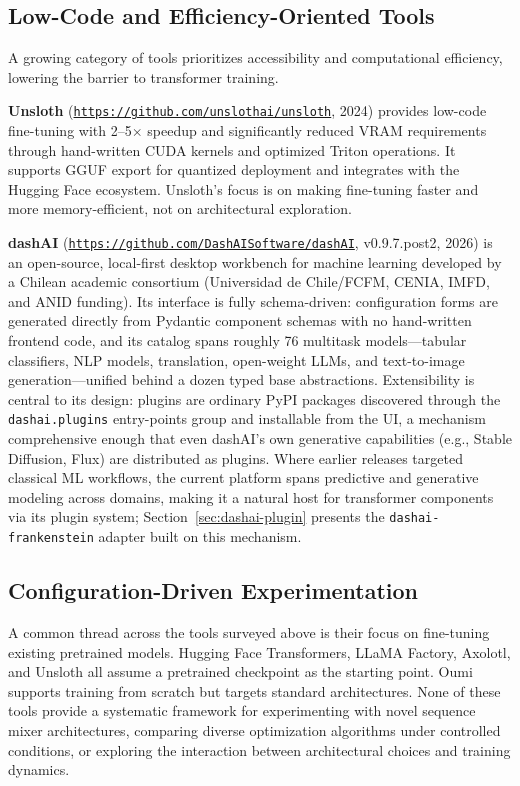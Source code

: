 \subsection{Low-Code and Efficiency-Oriented Tools}

A growing category of tools prioritizes accessibility and computational efficiency, lowering the barrier to transformer training.

\textbf{Unsloth} (\texttt{\url{https://github.com/unslothai/unsloth}}, 2024) provides low-code fine-tuning with 2--5$\times$ speedup and significantly reduced VRAM requirements through hand-written CUDA kernels and optimized Triton operations. It supports GGUF export for quantized deployment and integrates with the Hugging Face ecosystem. Unsloth's focus is on making fine-tuning faster and more memory-efficient, not on architectural exploration.

\textbf{dashAI} (\texttt{\url{https://github.com/DashAISoftware/dashAI}}, v0.9.7.post2, 2026) is an open-source, local-first desktop workbench for machine learning developed by a Chilean academic consortium (Universidad de Chile/FCFM, CENIA, IMFD, and ANID funding). Its interface is fully schema-driven: configuration forms are generated directly from Pydantic component schemas with no hand-written frontend code, and its catalog spans roughly 76 multitask models---tabular classifiers, NLP models, translation, open-weight LLMs, and text-to-image generation---unified behind a dozen typed base abstractions. Extensibility is central to its design: plugins are ordinary PyPI packages discovered through the \texttt{dashai.plugins} entry-points group and installable from the UI, a mechanism comprehensive enough that even dashAI's own generative capabilities (e.g., Stable Diffusion, Flux) are distributed as plugins. Where earlier releases targeted classical ML workflows, the current platform spans predictive and generative modeling across domains, making it a natural host for transformer components via its plugin system; Section~\ref{sec:dashai-plugin} presents the \texttt{dashai-frankenstein} adapter built on this mechanism.

\subsection{Configuration-Driven Experimentation}

A common thread across the tools surveyed above is their focus on fine-tuning existing pretrained models. Hugging Face Transformers, LLaMA Factory, Axolotl, and Unsloth all assume a pretrained checkpoint as the starting point. Oumi supports training from scratch but targets standard architectures. None of these tools provide a systematic framework for experimenting with novel sequence mixer architectures, comparing diverse optimization algorithms under controlled conditions, or exploring the interaction between architectural choices and training dynamics.

